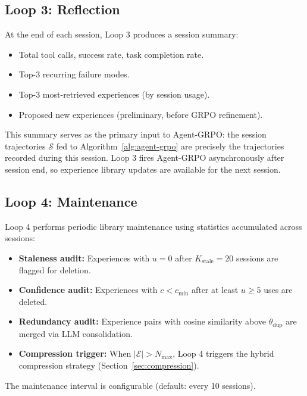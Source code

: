 \documentclass[11pt]{article}
\begin{document}
\subsection{Loop 3: Reflection}

At the end of each session, Loop 3 produces a session summary:
\begin{itemize}[leftmargin=1.5em]
    \item Total tool calls, success rate, task completion rate.
    \item Top-3 recurring failure modes.
    \item Top-3 most-retrieved experiences (by session usage).
    \item Proposed new experiences (preliminary, before GRPO refinement).
\end{itemize}

This summary serves as the primary input to Agent-GRPO: the session
trajectories $\mathcal{S}$ fed to Algorithm~\ref{alg:agent-grpo} are
precisely the trajectories recorded during this session. Loop 3 fires
Agent-GRPO asynchronously after session end, so experience library updates
are available for the next session.

\subsection{Loop 4: Maintenance}

Loop 4 performs periodic library maintenance using statistics accumulated
across sessions:

\begin{itemize}[leftmargin=1.5em]
    \item \textbf{Staleness audit:} Experiences with $u = 0$ after
          $K_{\text{stale}} = 20$ sessions are flagged for deletion.
    \item \textbf{Confidence audit:} Experiences with $c < c_{\text{min}}$
          after at least $u \geq 5$ uses are deleted.
    \item \textbf{Redundancy audit:} Experience pairs with cosine similarity
          above $\theta_{\text{dup}}$ are merged via LLM consolidation.
    \item \textbf{Compression trigger:} When $|\mathcal{E}| > N_{\max}$,
          Loop 4 triggers the hybrid compression strategy
          (Section~\ref{sec:compression}).
\end{itemize}

The maintenance interval is configurable (default: every 10 sessions).
\end{document}
